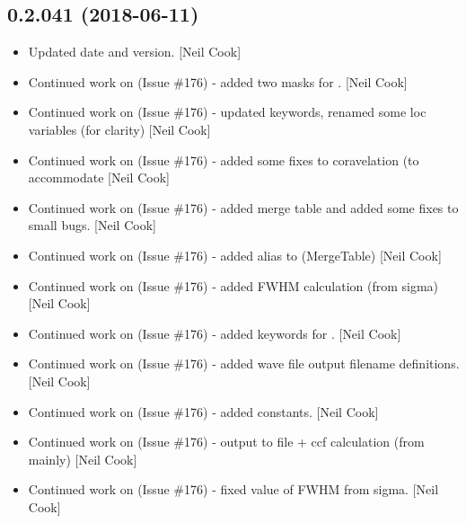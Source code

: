 \documentclass[a4paper,10pt,english]{report}
\begin{document}
\subsection{0.2.041 (2018-06-11)}
\label{\detokenize{misc/changelog:id423}}\begin{itemize}
\item {} 
Updated date and version. {[}Neil Cook{]}

\item {} 
Continued work on  (Issue \#176) - added two masks for .
{[}Neil Cook{]}

\item {} 
Continued work on  (Issue \#176) - updated keywords, renamed some
loc variables (for clarity) {[}Neil Cook{]}

\item {} 
Continued work on  (Issue \#176) - added some fixes to
coravelation (to accommodate  {[}Neil Cook{]}

\item {} 
Continued work on  (Issue \#176) - added merge table and added
some fixes to small bugs. {[}Neil Cook{]}

\item {} 
Continued work on  (Issue \#176) - added alias to
 (MergeTable) {[}Neil Cook{]}

\item {} 
Continued work on  (Issue \#176) - added FWHM calculation (from
sigma) {[}Neil Cook{]}

\item {} 
Continued work on  (Issue \#176) - added keywords for .
{[}Neil Cook{]}

\item {} 
Continued work on  (Issue \#176) - added wave file output
filename definitions. {[}Neil Cook{]}

\item {} 
Continued work on  (Issue \#176) - added constants. {[}Neil Cook{]}

\item {} 
Continued work on  (Issue \#176) - output to file + ccf
calculation (from  mainly) {[}Neil Cook{]}

\item {} 
Continued work on  (Issue \#176) - fixed value of FWHM from
sigma. {[}Neil Cook{]}

\end{itemize}
\end{document}

